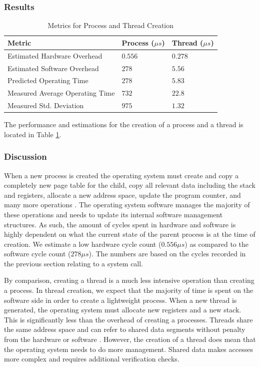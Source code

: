\documentclass[sigconf]{acmart}
\begin{document}
\subsubsection{Results}
\begin{table}[h!]
\centering
\caption{Metrics for Process and Thread Creation}
\begin{tabular}{|l|l|l|}
\hline
\textbf{Metric}					& \textbf{Process ($\mu s$)}	& \textbf{Thread ($\mu s$)}	\\ \hline
Estimated Hardware Overhead		& $0.556$						& $0.278$					\\ \hline
Estimated Software Overhead		& $278$							& $5.56$					\\ \hline
Predicted Operating Time		& $278$							& $5.83$					\\ \hline
Measured Average Operating Time	& $732$							& $22.8$					\\ \hline
Measured Std. Deviation			& $975$ 						& $1.32$					\\ \hline
\end{tabular}
\label{ProcThreadCreationMetrics}
\end{table}
The performance and estimations for the creation of a process and a thread is located in Table \ref{ProcThreadCreationMetrics}.

\subsubsection{Discussion}
When a new process is created the operating system must create and copy a completely new page table for the child, copy all relevant data including the stack and registers, allocate a new address space, update the program counter, and many more operations \cite{cs4411}. The operating system software manages the majority of these operations and needs to update its internal software management structures. As such, the amount of cycles spent in hardware and software is highly dependent on what the current state of the parent process is at the time of creation. We estimate a low hardware cycle count ($0.556 \mu s$) as compared to the software cycle count ($278 \mu s$). The numbers are based on the cycles recorded in the previous section relating to a system call.

By comparison, creating a thread is a much less intensive operation than creating a process. In thread creation, we expect that the majority of time is spent on the software side in order to create a lightweight process. When a new thread is generated, the operating system must allocate new registers and a new stack. This is significantly less than the overhead of creating a processes. Threads share the same address space and can refer to shared data segments without penalty from the hardware or software \cite{robbins_2000}. However, the creation of a thread does mean that the operating system needs to do more management. Shared data makes accesses more complex and requires additional verification checks.
\end{document}
